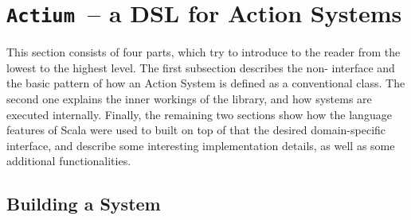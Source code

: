 \chapter[Actium~-- a DSL for Action Systems]{{\texttt{Actium}}~-- a DSL for Action Systems}
\label{sec:implementation}


This section consists of four parts, which try to introduce \actium{} to the reader from the lowest
to the highest level. The first subsection describes the non-\dsl{} interface and the basic pattern
of how an Action System is defined as a conventional class. The second one explains the inner
workings of the library, and how systems are executed internally. Finally, the remaining two
sections show how the language features of Scala were used to built on top of that the desired
domain-specific interface, and describe some interesting implementation details, as well as some
additional functionalities.

\section{Building a System}
\label{sec:building}

